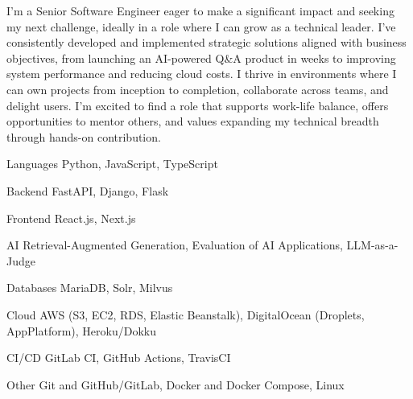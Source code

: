 \documentclass[11pt, a4paper]{awesome-cv}
\begin{document}
\makecvheader[C]




\begin{cvparagraph}
  I'm a Senior Software Engineer eager to make a significant impact and seeking my next challenge, ideally in a role where I can grow as a technical leader. I've consistently developed and implemented strategic solutions aligned with business objectives, from launching an AI-powered Q\&A product in weeks to improving system performance and reducing cloud costs. I thrive in environments where I can own projects from inception to completion, collaborate across teams, and delight users. I'm excited to find a role that supports work-life balance, offers opportunities to mentor others, and values expanding my technical breadth through hands-on contribution.
\end{cvparagraph}



\begin{cvskills}

  \cvskill
    {Languages}
    {Python, JavaScript, TypeScript}

  \cvskill
    {Backend}
    {FastAPI, Django, Flask}

  \cvskill
    {Frontend}
    {React.js, Next.js}

  \cvskill
    {AI}
    {Retrieval-Augmented Generation, Evaluation of AI Applications, LLM-as-a-Judge}

  \cvskill
    {Databases}
    {MariaDB, Solr, Milvus}

  \cvskill
    {Cloud}
    {AWS (S3, EC2, RDS, Elastic Beanstalk), DigitalOcean (Droplets, AppPlatform), Heroku/Dokku}

  \cvskill
    {CI/CD}
    {GitLab CI, GitHub Actions, TravisCI}

  \cvskill
    {Other}
    {Git and GitHub/GitLab, Docker and Docker Compose, Linux}

\end{cvskills}
\end{document}
